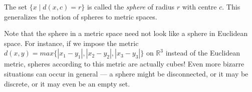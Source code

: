 \documentclass[12pt]{article}
\begin{document}
The set $\{ x \mid d(x,c) = r \}$ is called the \emph{sphere} of radius $r$ with centre $c$.  This generalizes the notion of spheres to metric spaces.  

Note that the sphere in a metric space need not look like a sphere in Euclidean space.  For instance, if we impose the metric $d(x,y) = max \{|x_1-y_1|, |x_2-y_2|, |x_3-y_3|\}$ on $\mathbb{R}^3$ instead of the Euclidean metric, spheres according to this metric are actually cubes!  Even more bizarre situations can occur in general --- a sphere might be disconnected, or it may be discrete, or it may even be an empty set.
\end{document}
